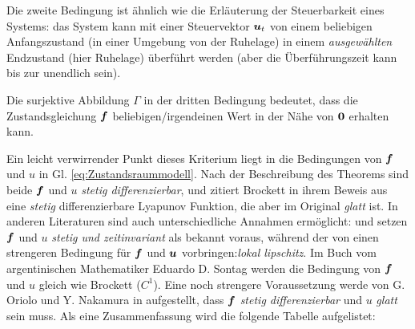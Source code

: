 Die zweite Bedingung ist ähnlich wie die Erläuterung der Steuerbarkeit eines Systems: das System kann mit einer Steuervektor $\boldsymbol u_{t}$ von einem beliebigen Anfangszustand (in einer Umgebung von der Ruhelage) in einem \emph{ausgewählten} Endzustand (hier Ruhelage) überführt werden (aber die Überführungszeit kann bis zur unendlich sein).

Die surjektive Abbildung $\Gamma$ in der dritten Bedingung bedeutet, dass die Zustandsgleichung $\boldsymbol f$ beliebigen/irgendeinen Wert in der Nähe von $\boldsymbol 0$ erhalten kann.   

Ein leicht verwirrender Punkt dieses Kriterium liegt in die Bedingungen von $\boldsymbol f$ und $u$ in Gl. \eqref{eq:Zustandsraummodell}. Nach der Beschreibung des Theorems sind beide $\boldsymbol f$ und $u$ \emph{stetig differenzierbar}, und zitiert Brockett in ihrem Beweis aus \cite[S.324]{wilson1967structure} eine \emph{stetig} differenzierbare Lyapunov Funktion, die aber im Original \emph{glatt} ist. In anderen Literaturen sind auch unterschiedliche Annahmen ermöglicht: \cite{coron2007control} und \cite{orsi2003necessary} setzen $\boldsymbol f$ und $u$ \emph{stetig und zeitinvariant} als bekannt voraus, während der von \cite{stern2002brockett} einen strengeren Bedingung für $\boldsymbol f$ und $\boldsymbol u$ vorbringen:\emph{lokal lipschitz}. Im Buch vom argentinischen Mathematiker Eduardo D. Sontag \cite{sontag2013mathematical} werden die Bedingung von $\boldsymbol f$ und $u$ gleich wie Brockett ($C^{1}$). Eine noch strengere Voraussetzung werde von G. Oriolo und Y. Nakamura in \cite{oriolo1991control} aufgestellt, dass $\boldsymbol f$ \emph{stetig differenzierbar} und $u$ \emph{glatt} sein muss. Als eine Zusammenfassung wird die folgende Tabelle aufgelistet:
